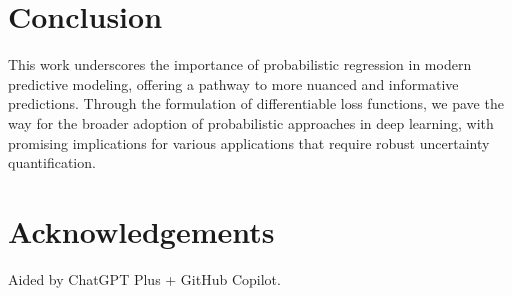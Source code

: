 \documentclass{article}
\begin{document}
\section{Conclusion}
This work underscores the importance of probabilistic regression in modern predictive modeling, offering a pathway to more nuanced and informative predictions. Through the formulation of differentiable loss functions, we pave the way for the broader adoption of probabilistic approaches in deep learning, with promising implications for various applications that require robust uncertainty quantification.


\section{Acknowledgements}
Aided by ChatGPT Plus + GitHub Copilot.
\end{document}

